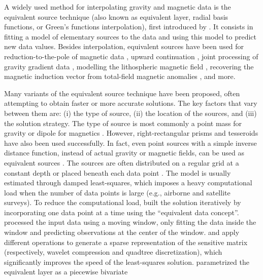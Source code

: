 \documentclass[twocolumn]{article}
\begin{document}
A widely used method for interpolating gravity and magnetic data
is the equivalent source technique (also known as equivalent layer, radial
basis functions, or Green's functions interpolation), first introduced by
\citet{dampney1969}.
It consists in fitting a model of elementary sources to the data and using this
model to predict new data values.
Besides interpolation, equivalent sources have been used for
reduction-to-the-pole of magnetic data
\citep{silva1986, nakatsuka2006, guspi2009}, upward
continuation \citep{emilia1973, li2010}, joint processing of gravity gradient
data \citep{barnes2011}, modelling the lithospheric magnetic field
\citep{kother2015}, recovering the magnetic induction vector from
total-field magnetic anomalies \citep{li2020}, and more.

Many variants of the equivalent source technique have been proposed, often
attempting to obtain faster or more accurate solutions.
The key factors that vary between them are: (i) the type of source, (ii)
the location of the sources, and (iii) the solution strategy.
The type of source is most commonly a point mass for gravity or dipole for
magnetics \citep[e.g.,~][]{vonfrese1981, silva1986, mendonca1994, siqueira2017}.
However, right-rectangular prisms \citep[e.g.,][]{barnes2011, jirigalatu2019,
li2020} and tesseroids \citep{bouman2016} have also been used successfully.
In fact, even point sources with a simple inverse distance function, instead of
actual gravity or magnetic fields, can be used as
equivalent sources \citep{cordell1992}.
The sources are often distributed on a regular grid at a constant depth
\citep[e.g.,~][]{leao1989, barnes2011, oliveira2013}
or placed beneath each data point \citep[e.g.,~][]{cordell1992, siqueira2017}.
The model is usually estimated through damped least-squares, which imposes a
heavy computational load when the number of data points is large (e.g.,
airborne and satellite surveys).
To reduce the computational load, \citet{mendonca1994} built the solution
iteratively by incorporating one data point at a time using the ``equivalent
data concept''.
\citet{leao1989} processed the input data using a moving window, only fitting the
data inside the window and predicting observations at the center of the window.
\citet{li2010} and \citet{barnes2011} apply different operations to generate a
sparse representation of the sensitive matrix (respectively, wavelet
compression and quadtree discretization), which significantly improves the
speed of the least-squares solution.
\citet{oliveira2013} parametrized the equivalent layer as a piecewise bivariate
\end{document}
